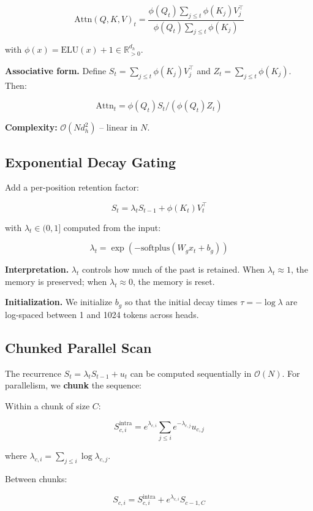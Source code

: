 \[
\text{Attn}(Q, K, V)_t = \frac{\phi(Q_t) \sum_{j \leq t} \phi(K_j) V_j^\top}{\phi(Q_t) \sum_{j \leq t} \phi(K_j)}
\tag{3.2}
\]

with $\phi(x) = \text{ELU}(x) + 1 \in \mathbb{R}_{>0}^{d_h}$.

\textbf{Associative form.} Define $S_t = \sum_{j \leq t} \phi(K_j) V_j^\top$ and 
$Z_t = \sum_{j \leq t} \phi(K_j)$. Then:

\[
\text{Attn}_t = \phi(Q_t) S_t / (\phi(Q_t) Z_t)
\tag{3.3}
\]

\textbf{Complexity:} $\mathcal{O}(N d_h^2)$ -- linear in $N$.

\subsection{Exponential Decay Gating}

Add a per-position retention factor:

\[
S_t = \lambda_t S_{t-1} + \phi(K_t) V_t^\top
\tag{3.4}
\]

with $\lambda_t \in (0, 1]$ computed from the input:

\[
\lambda_t = \exp(-\text{softplus}(W_g x_t + b_g))
\tag{3.5}
\]

\textbf{Interpretation.} $\lambda_t$ controls how much of the past is retained. 
When $\lambda_t \approx 1$, the memory is preserved; when $\lambda_t \approx 0$, 
the memory is reset.

\textbf{Initialization.} We initialize $b_g$ so that the initial decay times 
$\tau = -\log \lambda$ are log-spaced between 1 and 1024 tokens across heads.

\subsection{Chunked Parallel Scan}

The recurrence $S_t = \lambda_t S_{t-1} + u_t$ can be computed sequentially 
in $\mathcal{O}(N)$. For parallelism, we \textbf{chunk} the sequence:

Within a chunk of size $C$:

\[
S_{c, i}^{\text{intra}} = e^{\lambda_{c, i}} \sum_{j \leq i} e^{-\lambda_{c, j}} u_{c, j}
\tag{3.6}
\]

where $\lambda_{c, i} = \sum_{j \leq i} \log \lambda_{c, j}$.

Between chunks:

\[
S_{c, i} = S_{c, i}^{\text{intra}} + e^{\lambda_{c, i}} S_{c-1, C}
\tag{3.7}
\]

